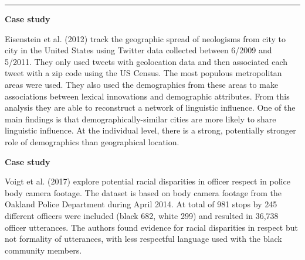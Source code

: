 \documentclass[
  letterpaper,
]{latex/krantz}
\begin{document}
\begin{center}\rule{0.5\linewidth}{0.5pt}\end{center}

\begin{tcolorbox}[enhanced jigsaw, colbacktitle=quarto-callout-caution-color!10!white, arc=.35mm, toprule=.15mm, breakable, colframe=quarto-callout-caution-color-frame, bottomrule=.15mm, opacitybacktitle=0.6, coltitle=black, titlerule=0mm, colback=white, toptitle=1mm, bottomtitle=1mm, title=\textcolor{quarto-callout-caution-color}{\faFire}\hspace{0.5em}{Caution}, rightrule=.15mm, leftrule=.75mm, opacityback=0, left=2mm]

\textbf{Case study}

Eisenstein et al. (2012) track the geographic spread of neologisms from
city to city in the United States using Twitter data collected between
6/2009 and 5/2011. They only used tweets with geolocation data and then
associated each tweet with a zip code using the US Census. The most
populous metropolitan areas were used. They also used the demographics
from these areas to make associations between lexical innovations and
demographic attributes. From this analysis they are able to reconstruct
a network of linguistic influence. One of the main findings is that
demographically-similar cities are more likely to share linguistic
influence. At the individual level, there is a strong, potentially
stronger role of demographics than geographical location.

\end{tcolorbox}

\begin{tcolorbox}[enhanced jigsaw, colbacktitle=quarto-callout-caution-color!10!white, arc=.35mm, toprule=.15mm, breakable, colframe=quarto-callout-caution-color-frame, bottomrule=.15mm, opacitybacktitle=0.6, coltitle=black, titlerule=0mm, colback=white, toptitle=1mm, bottomtitle=1mm, title=\textcolor{quarto-callout-caution-color}{\faFire}\hspace{0.5em}{Caution}, rightrule=.15mm, leftrule=.75mm, opacityback=0, left=2mm]

\textbf{Case study}

Voigt et al. (2017) explore potential racial disparities in officer
respect in police body camera footage. The dataset is based on body
camera footage from the Oakland Police Department during April 2014. At
total of 981 stops by 245 different officers were included (black 682,
white 299) and resulted in 36,738 officer utterances. The authors found
evidence for racial disparities in respect but not formality of
utterances, with less respectful language used with the black community
members.

\end{tcolorbox}
\end{document}
